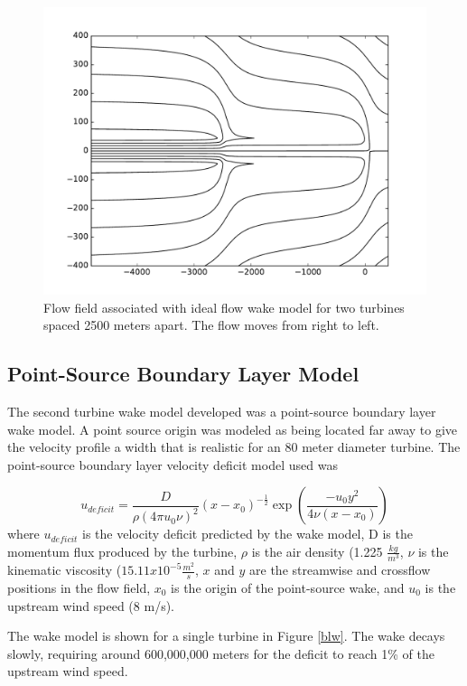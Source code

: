 \documentclass{article}
\begin{document}
\begin{figure}[htb!]
\centering
\includegraphics[scale=.4]{twoturbs}
\caption{\label{twoturbs} Flow field associated with ideal flow wake model for two turbines spaced 2500 meters apart. The flow moves from right to left.}
\end{figure}

\subsection{Point-Source Boundary Layer Model}
The second turbine wake model developed was a point-source boundary layer wake model. A point source origin was modeled as being located far away to give the velocity profile a width that is realistic for an 80 meter diameter turbine. The point-source boundary layer velocity deficit model used was

\begin{equation}
u_{deficit} = \frac{D}{\rho(4 \pi u_0 \nu)^2} \left(x-x_0\right)^{-\frac{1}{2}} \exp{\left(\frac{-u_0 y ^2}{4\nu (x-x_0)}\right)}
\end{equation}
where $u_{deficit}$ is the velocity deficit predicted by the wake model, D is the momentum flux produced by the turbine, $\rho$ is the air density (1.225 $\frac{kg}{m^3}$, $\nu$ is the kinematic viscosity ($15.11x10^{-5} \frac{m^2}{s}$, $x$ and $y$ are the streamwise and crossflow positions in the flow field, $x_0$ is the origin of the point-source wake, and $u_0$ is the upstream wind speed (8 m/s).

The wake model is shown for a single turbine in Figure \ref{blw}. The wake decays slowly, requiring around 600,000,000 meters for the deficit to reach 1\% of the upstream wind speed.
\end{document}
